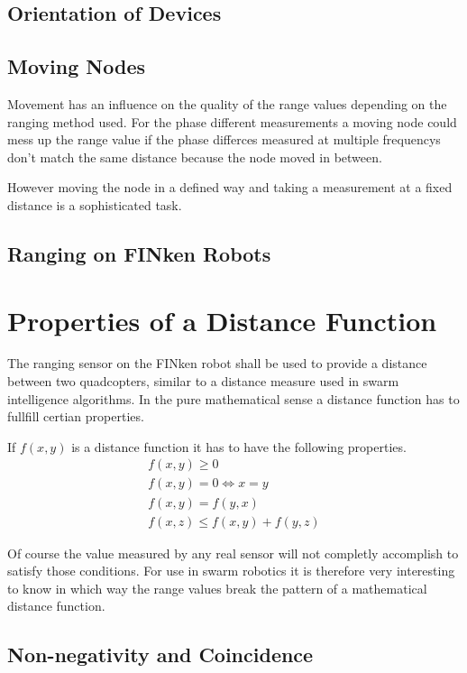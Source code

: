 \subsection{Orientation of Devices}


\subsection{Moving Nodes}
Movement has an influence on the quality of the range values depending on the ranging method used.
For the phase different measurements a moving node could mess up the range value if the phase differces measured at multiple frequencys don't match the same distance because the node moved in between. 

However moving the node in a defined way and taking a measurement at a fixed distance is a sophisticated task.

\subsection{Ranging on FINken Robots}

\section{Properties of a Distance Function}
The ranging sensor on the FINken robot shall be used to provide a distance between two quadcopters, similar to a distance measure used in swarm intelligence algorithms.
In the pure mathematical sense a distance function has to fullfill certian properties.

If $f(x, y)$ is a distance function it has to have the following properties.
\begin{eqnarray}
f(x, y) \ge 0 \\
f(x, y) = 0 \iff x = y \\ 
f(x, y) = f(y, x) \\ 
f(x, z) \le f(x, y) + f(y, z)
\end{eqnarray}

Of course the value measured by any real sensor will not completly accomplish to satisfy those conditions.
For use in swarm robotics it is therefore very interesting to know in which way the range values break the pattern of a mathematical distance function.

\subsection{Non-negativity and Coincidence}

